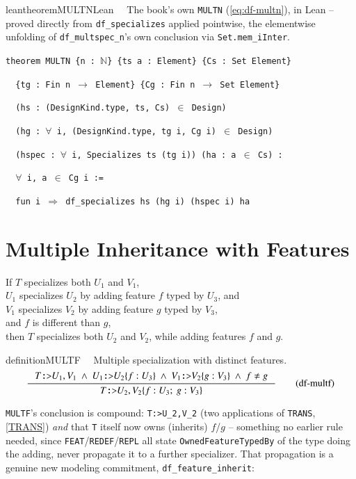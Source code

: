 \begin{restatable}{leantheorem}{MULTNLean}~~ The book's own \texttt{MULTN}
(\ref{eq:df-multn}), in Lean -- proved directly from \texttt{df\_specializes} applied pointwise,
the elementwise unfolding of \texttt{df\_multspec\_n}'s own conclusion via
\texttt{Set.mem\_iInter}.

\texttt{\textcolor{leancolor}{theorem} \textcolor{leanyellow}{MULTN} \{n : $\mathbb{N}$\} \{ts a : Element\} \{Cs : Set Element\}}

\texttt{~~\{tg : Fin n $\to$ Element\} \{Cg : Fin n $\to$ Set Element\}}

\texttt{~~(hs : (DesignKind.type, ts, Cs) $\in$ Design)}

\texttt{~~(hg : $\forall$ i, (DesignKind.type, tg i, Cg i) $\in$ Design)}

\texttt{~~(hspec : $\forall$ i, Specializes ts (tg i)) (ha : a $\in$ Cs) :}

\texttt{~~$\forall$ i, a $\in$ Cg i :=}

\texttt{~~fun i $\Rightarrow$ df\_specializes hs (hg i) (hspec i) ha}
\label{MULTN}
\end{restatable}

\section{Multiple Inheritance with Features}
If $T$ specializes both $U_1$ and $V_1$, \\
$U_1$ specializes $U_2$ by adding feature $f$ typed by $U_3$, and\\
$V_1$ specializes $V_2$ by adding feature $g$ typed by $V_3$, \\
and $f$ is different than $g$, \\
then $T$ specializes both $U_2$ and $V_2$, while adding features $f$ and $g$.
\begin{restatable}{definition}{MULTF}~~ Multiple specialization with distinct features.
\begin{align}
\inference
{T\texttt{:>}U_1 , V_1~\wedge~U_1\texttt{:>}U_2\{f:U_3\}~\wedge~V_1\texttt{:>}V_2\{g:V_3\}~\wedge~f \ne g}
{T\texttt{:>}U_2 , V_2\{f:U_3 ;~ g:V_3\}}
\label{eq:df-multf}\tag{df-multf}
\end{align}
\end{restatable}

\pn \texttt{MULTF}'s conclusion is compound: \texttt{T:>U\_2,V\_2} (two applications of
\texttt{TRANS}, \ref{TRANS}) \emph{and} that \texttt{T} itself now owns (inherits) $f$/$g$ --
something no earlier rule needed, since \texttt{FEAT}/\texttt{REDEF}/\texttt{REPL} all state
\texttt{OwnedFeatureTypedBy} of the type doing the adding, never propagate it to a further
specializer. That propagation is a genuine new modeling commitment, \texttt{df\_feature\_inherit}:

